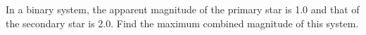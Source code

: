 In a binary system, the apparent magnitude of the primary star is 1.0 and
that of the secondary star is 2.0. Find the maximum combined magnitude of
this system.
